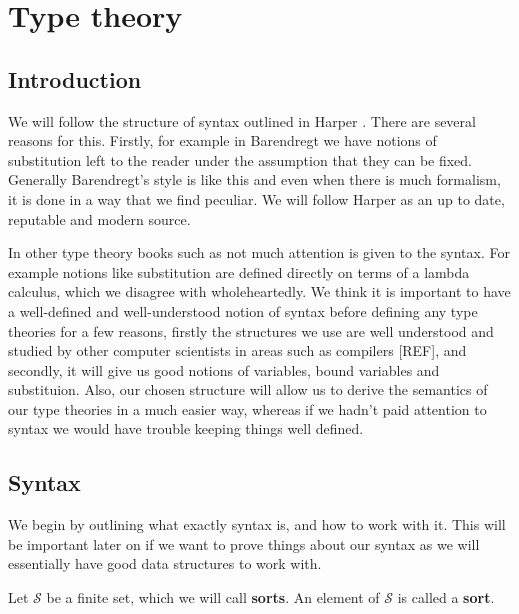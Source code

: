
\section{Type theory}

\subsection{Introduction}

We will follow the structure of syntax outlined in Harper \cite{harper_2016}. There are several reasons for this. Firstly, for example in Barendregt \cite{BarendregtHenk2013Lcwt} we have notions of substitution left to the reader under the assumption that they can be fixed. Generally Barendregt's style is like this and even when there is much formalism, it is done in a way that we find peculiar. We will follow Harper as an up to date, reputable and modern source.

In other type theory books such as \cite{CroleRoyL1993Cft, LambekJ1986Itho} not much attention is given to the syntax. For example notions like substitution are defined directly on terms of a lambda calculus, which we disagree with wholeheartedly. We think it is important to have a well-defined and well-understood notion of syntax before defining any type theories for a few reasons, firstly the structures we use are well understood and studied by other computer scientists in areas such as compilers [REF], and secondly, it will give us good notions of variables, bound variables and substituion. Also, our chosen structure will allow us to derive the semantics of our type theories in a much easier way, whereas if we hadn't paid attention to syntax we would have trouble keeping things well defined.


\subsection{Syntax}

We begin by outlining what exactly syntax is, and how to work with it. This will be important later on if we want to prove things about our syntax as we will essentially have good data structures to work with.


\begin{defin}[Sorts]
    Let $\mathcal{S}$ be a finite set, which we will call \textbf{sorts}. An element of $\mathcal{S}$ is called a \textbf {sort}.
\end{defin}

